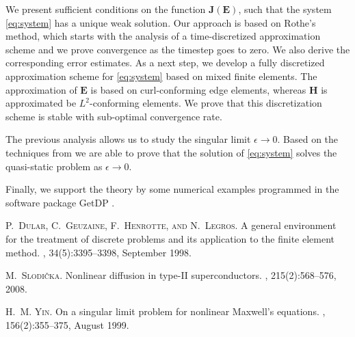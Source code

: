 We present sufficient conditions on the function $\mathbf J(\mathbf E)$, such that the system \eqref{eq:system} has a unique weak solution. Our approach is based on Rothe's method, which starts with the analysis of a time-discretized approximation scheme and we prove convergence as the timestep goes to zero. We also derive the corresponding error estimates. As a next step, we develop a fully discretized approximation scheme for \eqref{eq:system} based on mixed finite elements. The approximation of $\mathbf E$ is based on curl-conforming edge elements, whereas $\mathbf H$ is approximated be $L^2$-conforming elements. We prove that this discretization scheme is stable with sub-optimal convergence rate.

The previous analysis allows us to study the singular limit $\epsilon \to 0$. Based on the techniques from \cite{Yin1999} we are able to prove that the solution of \eqref{eq:system} solves the quasi-static problem as $\epsilon \to 0$. 

Finally, we support the theory by some numerical examples programmed in the software package GetDP \cite{Dular1998}.


\begin{thebibliography}{10}
\textsc{P.~Dular, C.~Geuzaine, F.~Henrotte, and N.~Legros}.
\newblock A general environment for the treatment of discrete problems and its application to the finite element method.
, 34(5):3395--3398, September 1998.

\textsc{M.~Slodi\v{c}ka}.
\newblock Nonlinear diffusion in type-II superconductors.
, 215(2):568--576, 2008.

\textsc{H.~M. Yin}.
\newblock On a singular limit problem for nonlinear {M}axwell's equations.
, 156(2):355--375, August 1999.
\end{thebibliography}